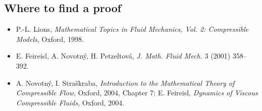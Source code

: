 \subsection*{Where to find a proof}

\begin{itemize}
\item P.-L. Lions, \emph{Mathematical Topics in Fluid Mechanics, Vol. 2: Compressible Models}, Oxford, 1998.
\item E. Feireisl, A. Novotný, H. Petzeltová, \emph{J. Math. Fluid Mech.} 3 (2001) 358--392.
\item A. Novotný, I. Straškraba, \emph{Introduction to the Mathematical Theory of Compressible Flow}, Oxford, 2004, Chapter 7; E. Feireisl, \emph{Dynamics of Viscous Compressible Fluids}, Oxford, 2004.
\end{itemize}

\neededfor
